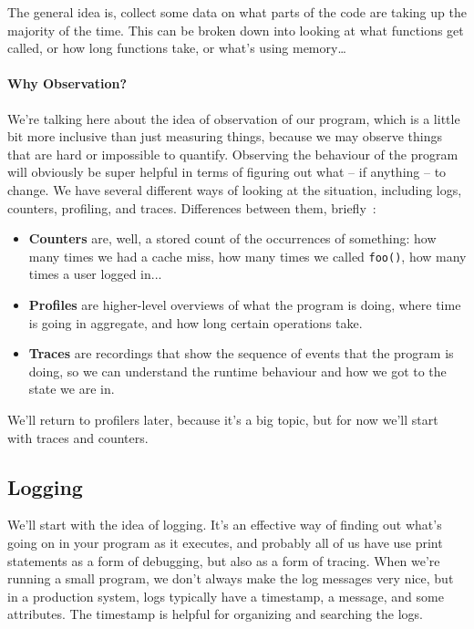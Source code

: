 \documentclass[a4paper]{report}
\begin{document}
The general idea is, collect some data on what parts of the code are taking up the majority of the time. This can be broken down into looking at what functions get called, or how long functions take, or what's using memory\ldots

\paragraph{Why Observation?} We're talking here about the idea of observation of our program, which is a little bit more inclusive than just measuring things, because we may observe things that are hard or impossible to quantify. Observing the behaviour of the program will obviously be super helpful in terms of figuring out what -- if anything -- to change. We have several different ways of looking at the situation, including logs, counters, profiling, and traces. Differences between them, briefly~\cite{usd}:

\begin{itemize}
	\item \textbf{Counters} are, well, a stored count of the occurrences of something: how many times we had a cache miss, how many times we called \texttt{foo()}, how many times a user logged in...
	\item \textbf{Profiles} are higher-level overviews of what the program is doing, where time is going in aggregate, and how long certain operations take.
	\item \textbf{Traces} are recordings that show the sequence of events that the program is doing, so we can understand the runtime behaviour and how we got to the state we are in.
\end{itemize}

We'll return to profilers later, because it's a big topic, but for now we'll start with traces and counters.

\subsection*{Logging}
We'll start with the idea of logging. It's an effective way of finding out what's going on in your program as it executes, and probably all of us have use print statements as a form of debugging, but also as a form of tracing. When we're running a small program, we don't always make the log messages very nice, but in a production system, logs typically have a timestamp, a message, and some attributes. The timestamp is helpful for organizing and searching the logs. 
\end{document}
